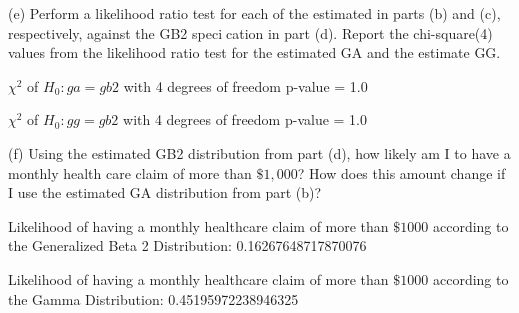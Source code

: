 \documentclass[letterpaper,12pt]{article}
\theoremstyle{definition}
\begin{document}
\noindent(e) Perform a likelihood ratio test for each of the estimated in parts (b) and (c), respectively, against the GB2 specication in part (d). Report the chi-square(4) values from the likelihood ratio test for the estimated GA and the estimate GG.
\par\bigskip
$\chi^2$ of $H_{0}: ga = gb2$ with 4 degrees of freedom p-value =  1.0
\par
$\chi^2$ of $H_{0}: gg = gb2$ with 4 degrees of freedom p-value =  1.0
\par\bigskip

\noindent(f) Using the estimated GB2 distribution from part (d), how likely am I to have a monthly health care claim of more than $\$1,000$? How does this amount change if I use the estimated GA distribution from part (b)?
\par\bigskip
Likelihood of having a monthly healthcare claim of more than $\$1000$ according to the Generalized Beta 2 Distribution:  0.16267648717870076
\par
Likelihood of having a monthly healthcare claim of more than $\$1000$ according to the Gamma Distribution:  0.45195972238946325
\end{document}
